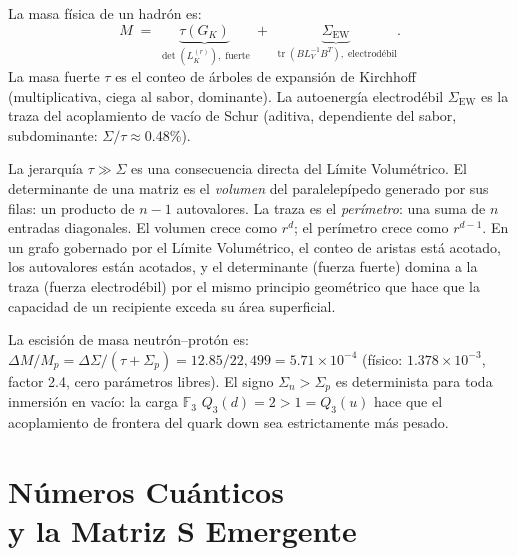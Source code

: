 \documentclass[11pt, a4paper, openany]{book}
\begin{document}
\begin{theorem}
La masa f\'isica de un hadr\'on es:
\begin{equation}
  M \;=\; \underbrace{\tau(G_K)}_{\det(L_K^{(r)}),\;\text{fuerte}}
    \;+\; \underbrace{\Sigma_{\mathrm{EW}}}_{\operatorname{tr}(B L_V^{-1} B^T),
      \;\text{electrod\'ebil}}.
\end{equation}
La masa fuerte $\tau$ es el conteo de \'arboles de expansi\'on de
Kirchhoff (multiplicativa, ciega al sabor, dominante). La
autoenerg\'ia electrod\'ebil $\Sigma_{\mathrm{EW}}$ es la traza del
acoplamiento de vac\'io de Schur (aditiva, dependiente del sabor,
subdominante: $\Sigma/\tau \approx 0.48\%$).
\end{theorem}

La jerarqu\'ia $\tau \gg \Sigma$ es una consecuencia directa del
L\'imite Volum\'etrico. El determinante de una matriz es el
\emph{volumen} del paralelep\'ipedo generado por sus filas: un producto
de $n - 1$ autovalores. La traza es el \emph{per\'imetro}: una suma de
$n$ entradas diagonales. El volumen crece como $r^d$; el per\'imetro
crece como $r^{d-1}$. En un grafo gobernado por el L\'imite
Volum\'etrico, el conteo de aristas est\'a acotado, los autovalores
est\'an acotados, y el determinante (fuerza fuerte) domina a la traza
(fuerza electrod\'ebil) por el mismo principio geom\'etrico que hace
que la capacidad de un recipiente exceda su \'area superficial.

\begin{theorem}
La escisi\'on de masa neutr\'on--prot\'on es:
$\Delta M / M_p = \Delta\Sigma / (\tau + \Sigma_p)
= 12.85 / 22{,}499 = 5.71 \times 10^{-4}$
(f\'isico: $1.378 \times 10^{-3}$, factor 2.4, cero par\'ametros
libres). El signo $\Sigma_n > \Sigma_p$ es determinista para toda
inmersi\'on en vac\'io: la carga $\mathbb{F}_3$
$Q_3(d) = 2 > 1 = Q_3(u)$ hace que el acoplamiento de frontera del
quark down sea estrictamente m\'as pesado.
\end{theorem}


\chapter[N\'umeros Cu\'anticos y la Matriz S Emergente]{N\'umeros Cu\'anticos\\y la Matriz S Emergente}
\end{document}
